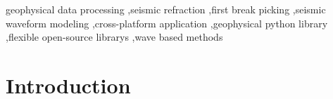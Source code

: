 \documentclass[a4paper,fleqn]{cas-sc}
\begin{document}
\begin{keywords}
geophysical data processing \sep seismic refraction \sep first break picking \sep seismic waveform modeling \sep cross-platform application \sep geophysical python library \sep flexible open-source librarys \sep wave based methods
\end{keywords}

\maketitle 

\printcredits

\doublespacing

\section{Introduction}
\label{intro}
\end{document}
